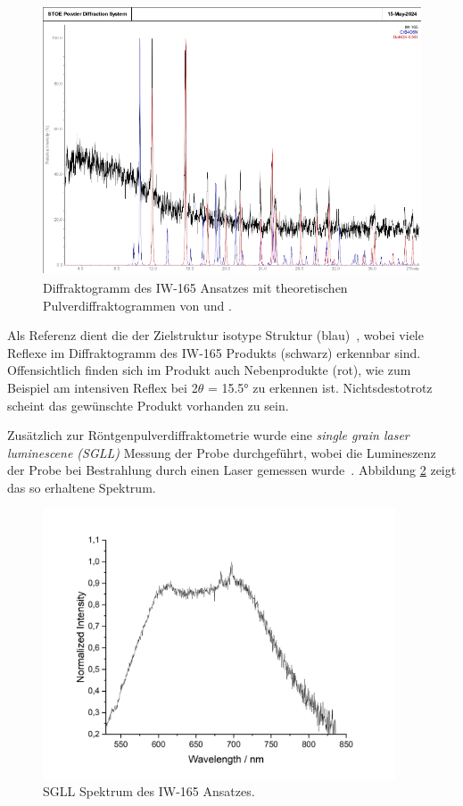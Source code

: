 \documentclass[12pt]{article}
\begin{document}
\begin{figure}[H]
    \centering
    \includegraphics[height=8cm]{Images/165.jpg}
    \caption{Diffraktogramm des IW-165 Ansatzes mit theoretischen Pulverdiffraktogrammen von  und .}
    \label{fig:1}
\end{figure}

\noindent Als Referenz dient die der Zielstruktur  isotype  Struktur (blau)~\cite{Fuchs2021}, wobei viele Reflexe im Diffraktogramm des IW-165 Produkts (schwarz) erkennbar sind.
Offensichtlich finden sich im Produkt auch  Nebenprodukte (rot), wie zum Beispiel am intensiven Reflex bei 2$\theta$ = 15.5\si{\degree} zu erkennen ist.
Nichtsdestotrotz scheint das gewünschte Produkt vorhanden zu sein.

\noindent Zusätzlich zur Röntgenpulverdiffraktometrie wurde eine \textit{single grain laser luminescene (SGLL)} Messung der Probe durchgeführt, wobei die Lumineszenz der Probe bei Bestrahlung durch einen Laser gemessen wurde~\cite{Duller1999}.
Abbildung \ref{fig:SGLL} zeigt das so erhaltene Spektrum.

\begin{figure}[H]
    \centering
    \includegraphics[height=8cm]{Images/IW_165_single_grain_4sec_avg6.png}
    \caption{SGLL Spektrum des IW-165 Ansatzes.}
    \label{fig:SGLL}
\end{figure}
\end{document}
